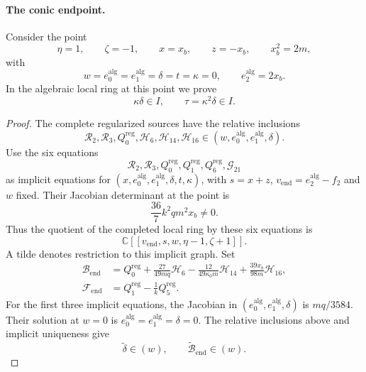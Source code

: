 \documentclass[11pt,a4paper]{article}
\numberwithin{equation}{section}
\theoremstyle{plain}
\theoremstyle{definition}
\theoremstyle{remark}
\begin{document}
\paragraph{The conic endpoint.}\label{appr3whole:endpoint}
Consider the point
\[
 \eta=1,\qquad \zeta=-1,\qquad
 x=x_b,\qquad z=-x_b,\qquad x_b^2=2m,
\]
with
\[
 w=e_0^{\mathrm{alg}}=e_1^{\mathrm{alg}}=\delta=t=\kappa=0,
 \qquad e_2^{\mathrm{alg}}=2x_b.
\]
In the algebraic local ring at this point we prove
\[
 \kappa\delta\in I,\qquad \tau=\kappa^2\delta\in I.
\]
\begin{proof}
The complete regularized sources have the relative inclusions
\[
 \mathcal R_2,\mathcal R_3,Q_0^{\mathrm{reg}},
       \mathcal H_6,\mathcal H_{14},\mathcal H_{16}
       \in(w,e_0^{\mathrm{alg}},e_1^{\mathrm{alg}},\delta).
\]
Use the six equations
\[
 \mathcal R_2,\mathcal R_3,Q_0^{\mathrm{reg}},
 Q_1^{\mathrm{reg}},Q_6^{\mathrm{reg}},\mathcal G_{21}
\]
as implicit equations for
$(x,e_0^{\mathrm{alg}},e_1^{\mathrm{alg}},\delta,t,\kappa)$,
with $s=x+z$, $v_{\mathrm{end}}=e_2^{\mathrm{alg}}-f_2$ and $w$
fixed. Their Jacobian determinant at the point is
\[
 \frac{36}{7}k^2qm^2x_b\ne0.
\]
Thus the quotient of the completed local ring by these six
equations is
\[
 \mathbb C[[v_{\mathrm{end}},s,w,\eta-1,\zeta+1]].
\]
A tilde denotes restriction to this implicit graph. Set
\[
 \begin{aligned}
 \mathcal B_{\mathrm{end}}
   &=Q_0^{\mathrm{reg}}
      +\frac{27}{49mq}\mathcal H_6
      -\frac{12}{49\kappa_0m}\mathcal H_{14}
      +\frac{39x_b}{98m}\mathcal H_{16},\\
 \mathcal F_{\mathrm{end}}
   &=Q_1^{\mathrm{reg}}-\frac1kQ_5^{\mathrm{reg}}.
 \end{aligned}
\]
For the first three implicit equations, the Jacobian in
$(e_0^{\mathrm{alg}},e_1^{\mathrm{alg}},\delta)$ is $mq/3584$.
Their solution at $w=0$ is
$e_0^{\mathrm{alg}}=e_1^{\mathrm{alg}}=\delta=0$.
The relative inclusions above and implicit uniqueness give
\[
 \widetilde\delta\in(w),\qquad
 \widetilde{\mathcal B}_{\mathrm{end}}\in(w).
\]


\end{proof}
\end{document}
